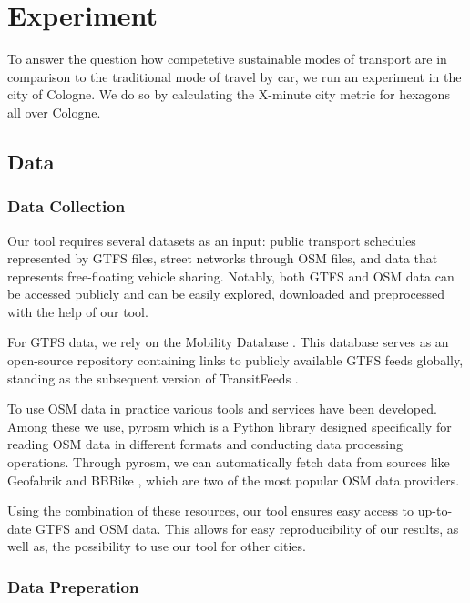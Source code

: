 \clearpage
\section{Experiment}
\label{sec:experiment}

To answer the question how competetive sustainable modes of transport are in comparison to the traditional mode of travel by car, we run an experiment in the city of Cologne.
We do so by calculating the X-minute city metric for hexagons all over Cologne.


\subsection{Data}
\label{subs:data}

\subsubsection{Data Collection}
\label{subs:data_collection}

Our tool requires several datasets as an input: public transport schedules represented by GTFS files, street networks through OSM files, and data that represents free-floating vehicle sharing.
Notably, both GTFS and OSM data can be accessed publicly and can be easily explored, downloaded and preprocessed with the help of our tool.

For GTFS data, we rely on the Mobility Database .
This database serves as an open-source repository containing links to publicly available GTFS feeds globally, standing as the subsequent version of TransitFeeds .

To use OSM data in practice various tools and services have been developed.
Among these we use, pyrosm  which is a Python library designed specifically for reading OSM data in different formats and conducting data processing operations.
Through pyrosm, we can automatically fetch data from sources like Geofabrik \cite{GeofabrikDownloadServer} and BBBike \cite{BBBikeExtractsOpenStreetMap}, which are two of the most popular OSM data providers.

Using the combination of these resources, our tool ensures easy access to up-to-date GTFS and OSM data.
This allows for easy reproducibility of our results, as well as, the possibility to use our tool for other cities.

\subsubsection{Data Preperation}
\label{subs:data_preperation}

